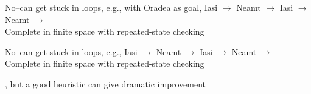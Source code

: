 \documentclass{article}
\begin{document}
\begin{huge}
\textwidth
{}





\vspace*{0.3in}

\textwidth
{}





\vspace*{0.3in}

\textwidth
{}





\vspace*{0.3in}

\textwidth
{}








 No--can get stuck in loops, e.g., with Oradea as goal,\nl
Iasi $\rightarrow$ Neamt $\rightarrow$ Iasi $\rightarrow$ Neamt $\rightarrow$\\
Complete in finite space with repeated-state checking




 No--can get stuck in loops, e.g.,\nl
Iasi $\rightarrow$ Neamt $\rightarrow$ Iasi $\rightarrow$ Neamt $\rightarrow$\\
Complete in finite space with repeated-state checking

 , but a good heuristic can give dramatic improvement




\end{huge}
\end{document}
